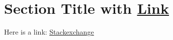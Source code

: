 \documentclass{article}
\begin{document}
\section{Section Title with \href{www.tex.stackexchange.com}{\uline{Link}}}
Here is a link: \href{www.tex.stackexchange.com}{\uline{Stackexchange}}
\end{document}
